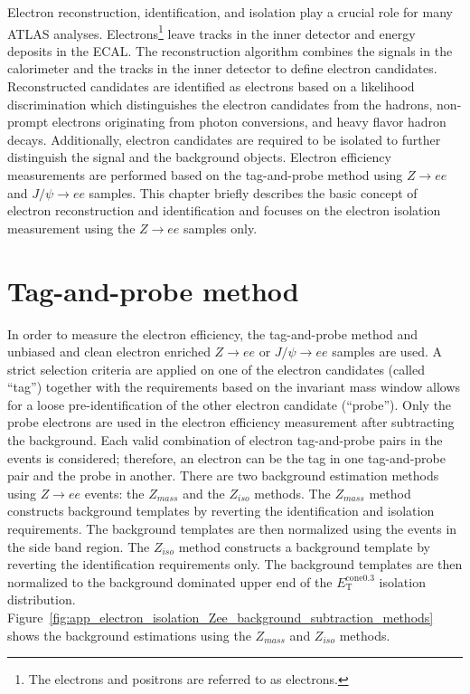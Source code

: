 Electron reconstruction, identification, and isolation play a crucial role for many ATLAS analyses.
Electrons\footnote{The electrons and positrons are referred to as electrons.} leave tracks in the inner detector and energy deposits in the ECAL.
The reconstruction algorithm combines the signals in the calorimeter and the tracks in the inner detector to define electron candidates.
Reconstructed candidates are identified as electrons based on a likelihood discrimination which distinguishes the electron candidates from the hadrons, non-prompt electrons originating from photon conversions, and heavy flavor hadron decays.
Additionally, electron candidates are required to be isolated to further distinguish the signal and the background objects.
Electron efficiency measurements are performed based on the tag-and-probe method using $Z \to ee$ and $J/\psi \to ee$ samples.
This chapter briefly describes the basic concept of electron reconstruction and identification and focuses on the electron isolation measurement using the $Z \to ee$ samples only.


\section{Tag-and-probe method}
\label{sec:app_tag_and_probe_method}
In order to measure the electron efficiency, the tag-and-probe method and unbiased and clean electron enriched $Z \to ee$ or $J/\psi \to ee$ samples are used.
A strict selection criteria are applied on one of the electron candidates (called ``tag'') together with the requirements based on the invariant mass window allows for a loose pre-identification of the other electron candidate (``probe'').
Only the probe electrons are used in the electron efficiency measurement after subtracting the background.
Each valid combination of electron tag-and-probe pairs in the events is considered; therefore, an electron can be the tag in one tag-and-probe pair and the probe in another.
There are two background estimation methods using $Z \to ee$ events: the $Z_{mass}$ and the $Z_{iso}$ methods.
The $Z_{mass}$ method constructs background templates by reverting the identification and isolation requirements.
The background templates are then normalized using the events in the side band region.
The $Z_{iso}$ method constructs a background template by reverting the identification requirements only.
The background templates are then normalized to the background dominated upper end of the $E_\mathrm{T}^\mathrm{cone0.3}$ isolation distribution.
Figure~\ref{fig:app_electron_isolation_Zee_background_subtraction_methods} shows the background estimations using the $Z_{mass}$ and $Z_{iso}$ methods.

